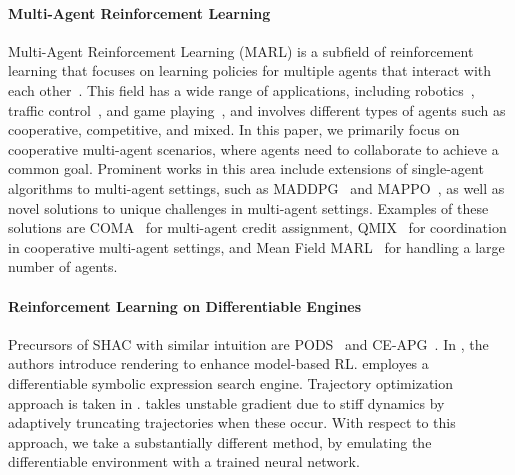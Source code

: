 \paragraph{Multi-Agent Reinforcement Learning}
Multi-Agent Reinforcement Learning (MARL) is a subfield of reinforcement learning that focuses on learning policies for multiple agents that interact with each other~\cite{albrecht2024multi}. 
This field has a wide range of applications, 
including robotics~\cite{DBLP:journals/air/ChungFYN24}, 
traffic control~\cite{DBLP:journals/tits/ChuWCL20}, 
and game playing~\cite{DBLP:conf/iclr/BakerKMWPMM20,jaderberg2019human}, 
and involves different types of agents such as cooperative, competitive, and mixed. 
In this paper, we primarily focus on cooperative multi-agent scenarios, 
where agents need to collaborate to achieve a common goal. 
Prominent works in this area include extensions of single-agent algorithms to multi-agent settings, 
such as MADDPG~\cite{DBLP:conf/nips/LoweWTHAM17} and MAPPO~\cite{DBLP:conf/nips/YuVVGWBW22}, 
as well as novel solutions to unique challenges in multi-agent settings. Examples of these solutions are COMA~\cite{DBLP:conf/aaai/FoersterFANW18} for multi-agent credit assignment, 
QMIX~\cite{DBLP:conf/icml/RashidSWFFW18} for coordination in cooperative multi-agent settings, 
and Mean Field MARL~\cite{DBLP:conf/icml/YangLLZZW18} for handling a large number of agents.

\paragraph{Reinforcement Learning on Differentiable Engines}
Precursors of SHAC with similar intuition are PODS~\cite{Mora21} and CE-APG~\cite{Gillen22}. In \cite{Lv23}, the authors introduce rendering to enhance model-based RL. \cite{Zheng24} employes a differentiable symbolic expression search engine. Trajectory optimization approach is taken in \cite{Wan24}. \cite{Georgiev24} takles unstable gradient due to stiff dynamics by adaptively truncating trajectories when these occur. With respect to this approach, we take a substantially different method, by emulating the differentiable environment with a trained neural network.

